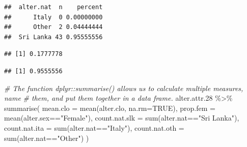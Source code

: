 \documentclass[
]{book}
\newenvironment{Shaded}{\begin{snugshade}}{\end{snugshade}}
\newcommand{\AttributeTok}[1]{\textcolor[rgb]{0.77,0.63,0.00}{#1}}
\newcommand{\CommentTok}[1]{\textcolor[rgb]{0.56,0.35,0.01}{\textit{#1}}}
\newcommand{\ConstantTok}[1]{\textcolor[rgb]{0.00,0.00,0.00}{#1}}
\newcommand{\FloatTok}[1]{\textcolor[rgb]{0.00,0.00,0.81}{#1}}
\newcommand{\FunctionTok}[1]{\textcolor[rgb]{0.00,0.00,0.00}{#1}}
\newcommand{\NormalTok}[1]{#1}
\newcommand{\SpecialCharTok}[1]{\textcolor[rgb]{0.00,0.00,0.00}{#1}}
\newcommand{\StringTok}[1]{\textcolor[rgb]{0.31,0.60,0.02}{#1}}
\begin{document}
\begin{verbatim}
##  alter.nat  n    percent
##      Italy  0 0.00000000
##      Other  2 0.04444444
##  Sri Lanka 43 0.95555556
\end{verbatim}

\begin{Shaded}
\end{Shaded}

\begin{verbatim}
## [1] 0.1777778
\end{verbatim}

\begin{Shaded}
\end{Shaded}

\begin{verbatim}
## [1] 0.9555556
\end{verbatim}

\begin{Shaded}
\begin{Highlighting}[]
\CommentTok{\# The function dplyr::summarise() allows us to calculate multiple measures, name}
\CommentTok{\# them, and put them together in a data frame.}
\NormalTok{alter.attr}\FloatTok{.28} \SpecialCharTok{\%\textgreater{}\%}
  \FunctionTok{summarise}\NormalTok{(}
    \AttributeTok{mean.clo =} \FunctionTok{mean}\NormalTok{(alter.clo, }\AttributeTok{na.rm=}\ConstantTok{TRUE}\NormalTok{), }
    \AttributeTok{prop.fem =} \FunctionTok{mean}\NormalTok{(alter.sex}\SpecialCharTok{==}\StringTok{"Female"}\NormalTok{), }
    \AttributeTok{count.nat.slk =} \FunctionTok{sum}\NormalTok{(alter.nat}\SpecialCharTok{==}\StringTok{"Sri Lanka"}\NormalTok{), }
    \AttributeTok{count.nat.ita =} \FunctionTok{sum}\NormalTok{(alter.nat}\SpecialCharTok{==}\StringTok{"Italy"}\NormalTok{), }
    \AttributeTok{count.nat.oth =} \FunctionTok{sum}\NormalTok{(alter.nat}\SpecialCharTok{==}\StringTok{"Other"}\NormalTok{)}
\NormalTok{  )}
\end{Highlighting}
\end{Shaded}
\end{document}
